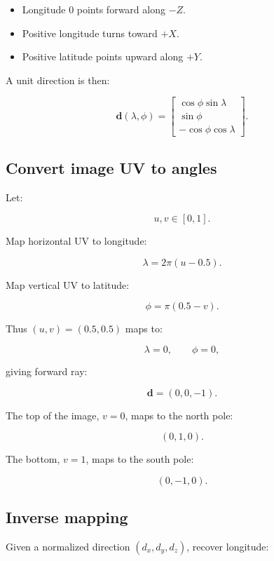 \begin{itemize}
\tightlist
\item
  Longitude \(0\) points forward along \(-Z\).
\item
  Positive longitude turns toward \(+X\).
\item
  Positive latitude points upward along \(+Y\).
\end{itemize}

A unit direction is then:

\[ \boxed{ \mathbf d(\lambda,\phi)= \begin{bmatrix} \cos\phi\sin\lambda\\ \sin\phi\\ -\cos\phi\cos\lambda \end{bmatrix}. } \]

\subsection{Convert image UV to angles}\label{02-foundations-ii-ch035-convert-image-uv-to-angles}

\hypertarget{02-foundations-ii-ch035-convert-image-uv-to-angles}{}

Let:

\[ u,v\in[0,1]. \]

Map horizontal UV to longitude:

\[ \boxed{ \lambda=2\pi(u-0.5). } \]

Map vertical UV to latitude:

\[ \boxed{ \phi=\pi(0.5-v). } \]

Thus \((u,v)=(0.5,0.5)\) maps to:

\[ \lambda=0,\qquad\phi=0, \]

giving forward ray:

\[ \boxed{\mathbf d=(0,0,-1)}. \]

The top of the image, \(v=0\), maps to the north pole:

\[ (0,1,0). \]

The bottom, \(v=1\), maps to the south pole:

\[ (0,-1,0). \]

\subsection{Inverse mapping}\label{02-foundations-ii-ch035-inverse-mapping}

\hypertarget{02-foundations-ii-ch035-inverse-mapping}{}

Given a normalized direction \((d_x,d_y,d_z)\), recover longitude:

